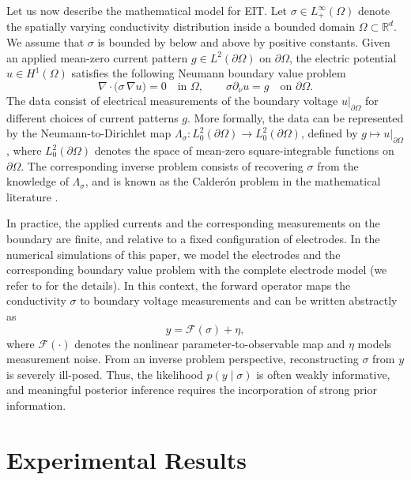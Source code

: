 \documentclass[a4paper,11pt]{article}
\theoremstyle{definition}
\theoremstyle{plain}
\theoremstyle{remark}
\begin{document}
Let us now describe the mathematical model for EIT. Let 
 $\sigma\in L_+^\infty(\Omega)$ denote the spatially varying
conductivity distribution inside a bounded domain
$\Omega \subset \mathbb{R}^d$. We assume that $\sigma$ is bounded by below and above by positive constants.
Given an applied mean-zero current pattern $g\in L^2(\partial\Omega)$ on $\partial\Omega$, the electric potential $u\in H^1(\Omega)$ satisfies the
following Neumann boundary value problem
\begin{equation*}
\nabla \cdot \big( \sigma\,\nabla u \big) = 0
\quad \text{in } \Omega,\qquad \sigma\partial_\nu u=g\quad \text{on } \partial\Omega.
\end{equation*}
The data consist of electrical measurements of the boundary voltage $u|_{\partial\Omega}$ for different choices of current patterns $g$. More formally, the data can be represented by the Neumann-to-Dirichlet map $\Lambda_\sigma\colon L_0^2(\partial\Omega)\to L_0^2(\partial\Omega)$, defined by $g\mapsto u|_{\partial\Omega}$, where $L_0^2(\partial\Omega)$ denotes the space of mean-zero square-integrable functions on $\partial\Omega$. The corresponding inverse problem consists of recovering $\sigma$ from the knowledge of $\Lambda_\sigma$, and is known as the Calderón problem in the mathematical literature \cite{calderon1980inverse,calderon-book}. 

In practice, the applied currents and the corresponding measurements on the boundary are finite, and relative to a fixed configuration of electrodes. In the numerical simulations of this paper, we model the electrodes and the corresponding boundary value problem with the complete electrode model (we refer to \cite{Somersalo} for the details).
In this context, the forward operator maps the conductivity $\sigma$ to boundary voltage
measurements and can be written abstractly as
\begin{equation*}
y = \mathcal{F}(\sigma) + \eta,
\end{equation*}
where $\mathcal{F}(\cdot)$ denotes the nonlinear parameter-to-observable map and $\eta$ models
measurement noise.
From an inverse problem perspective, reconstructing $\sigma$ from $y$ is severely
ill-posed.
Thus, the likelihood $p(y \mid \sigma)$ is often weakly informative, and meaningful
posterior inference requires the incorporation of strong prior information.



\section{Experimental Results}\label{sec:experiments}
\end{document}
